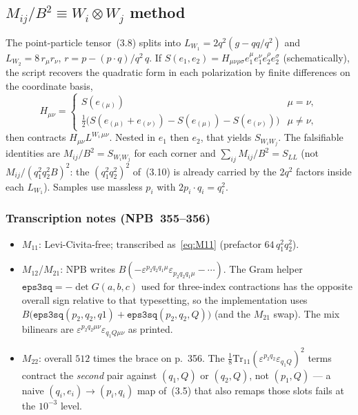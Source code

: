 \documentclass[11pt]{article}
\begin{document}
\subsection{$M_{ij}/B^2\equiv W_i\otimes W_j$ method}
\label{app:M11-method}

The point-particle tensor~(3.8) splits into
$L_{W_1}=2q^2(g-qq/q^2)$ and $L_{W_2}=8\,r_\mu r_\nu$,
$r=p-(p{\cdot}q)/q^2\,q$. If
$S(e_1,e_2)=H_{\mu\nu\rho\sigma}e_1^\mu e_1^\nu e_2^\rho e_2^\sigma$
(schematically), the script recovers the quadratic form in each
polarization by finite differences on the coordinate basis,
\[
  H_{\mu\nu}
  =\begin{cases}
     S(e_{(\mu)}) & \mu=\nu,\\
     \tfrac12\big(S(e_{(\mu)}+e_{(\nu)})-S(e_{(\mu)})-S(e_{(\nu)})\big)
       & \mu\neq\nu,
   \end{cases}
\]
then contracts $H_{\mu\nu}L^{W_i\,\mu\nu}$. Nested in $e_1$ then $e_2$,
that yields $S_{W_i W_j}$. The falsifiable identities are
$M_{ij}/B^2=S_{W_i W_j}$ for each corner and
$\sum_{ij}M_{ij}/B^2=S_{LL}$ (not $M_{ij}/(q_1^2 q_2^2 B)^2$: the
$(q_1^2 q_2^2)^2$ of~(3.10) is already carried by the $2q^2$ factors inside
each $L_{W_1}$). Samples use massless $p_i$ with $2p_i{\cdot}q_i=q_i^2$.

\subsubsection*{Transcription notes (NPB~355--356)}

\begin{itemize}
  \item $M_{11}$: Levi-Civita-free; transcribed as~\eqref{eq:M11}
    (prefactor $64\,q_1^2 q_2^2$).
  \item $M_{12}$/$M_{21}$: NPB writes
    $B(-\varepsilon^{p_2 q_2 q_1\mu}\varepsilon_{p_2 q_2 q_1\mu}-\cdots)$.
    The Gram helper $\texttt{eps3sq}=-\det G(a,b,c)$ used for three-index
    contractions has the opposite overall sign relative to that
    typesetting, so the implementation uses
    $B\bigl(\texttt{eps3sq}(p_2,q_2,q1)+\texttt{eps3sq}(p_2,q_2,Q)\bigr)$
    (and the $M_{21}$ swap). The mix bilinears are
    $\varepsilon^{p_2 q_2\mu\nu}\varepsilon_{q_1 Q\mu\nu}$ as printed.
  \item $M_{22}$: overall $512$ times the brace on p.~356. The
    $\tfrac18\mathrm{Tr}_{11}(\varepsilon^{p_2 q_2}\varepsilon_{q_1 Q})^2$
    terms contract the \emph{second} pair against $(q_1,Q)$ or $(q_2,Q)$,
    not $(p_1,Q)$ --- a naive $(q_i,e_i)\to(p_i,q_i)$ map of~(3.5) that
    also remaps those slots fails at the $10^{-3}$ level.
\end{itemize}
\end{document}
